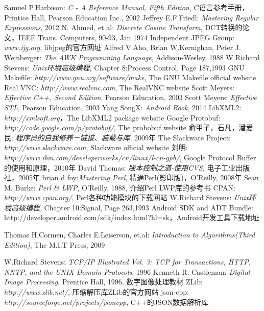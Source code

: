 \documentclass[a4paper]{book}
\begin{document}
\begin{thebibliography}{99}
 Samuel P.Harbison: {\em C - A Reference Manual, Fifth Edition}, C语言参考手册，Printice Hall, Pearson Education Inc., 2002
 Jeffrey E.F.Friedl: {\em Mastering Regular Expressions}, 2012
N. Ahmed, et al: {\em Discrete Cosine Transform}, DCT转换的论文，IEEE Trans. Computers, 90-93, Jan 1974
Independent JPEG Group: {\em www.ijg.org}, libjpeg的官方网址
 Alfred V.Aho, Brian W.Kernighan, Peter J. Weinberger: {\em The AWK Programming Language}, Addison-Wesley, 1988
 W.Richard Stevens: {\em Unix环境高级编程}, Chapter 8:Process Control, Page 187,1993
 GNU Makefile: {\em http://www.gnu.org/software/make}, The GNU Makefile official website
 Real VNC: {\em http://www.realvnc.com}, The RealVNC website
 Scott Meyers: {\em Effective C++, Second Edition}, Pearson Education, 2003
 Scott Meyers: {\em Effective STL}, Pearson Education, 2003
 Yang SongX: {\em Android Book}, 2014
 LibXML2: {\em http://xmlsoft.org}，The LibXML2 package website
 Google Protobuf: {\em http://code.google.com/p/protobuf/}, The probobuf website
 俞甲子，石凡，潘爱民: {\em 程序员的自我修养－链接、装载与库}, 2009年
 The Slackware Project: {\em http://www.slackware.com}, Slackware official website
 刘明: {\em http://www.ibm.com/developerworks/cn/linux/l-cn-gpb/}, Google Protocol Buffer 的使用和原理，2010年
 David Thomas: {\em 版本控制之道-使用CVS}, 电子工业出版社，2005年
 brian d foy:{\em Mastering Perl}, 精通Perl(影印版)，O'Reilly, 2008年
 Sean M. Burke: {\em Perl \& LWP}, O'Reilly, 1988, 介绍Perl LWP库的参考书
 CPAN: {\em http://www.cpan.org/}, Perl各种功能模块的下载网站
 W.Richard Stevens: {\em Unix环境高级编程}, Chapter 10:Signal, Page 263,1993
 Android SDK and ADT Bundle: http://developer.android.com/sdk/index.html?hl=sk，Android开发工具下载地址

Thomas H.Cormen, Charles E.Leiserson, et.al: {\em Introduction to Algorithms(Third Edition)}, The M.I.T Press, 2009

W.Richard Stevens: {\em TCP/IP Illustrated Vol. 3: TCP for Transactions, HTTP, NNTP, and the UNIX Domain Protocols}, 1996
 Kenneth R. Castleman: {\em Digital Image Processing}, Prentice Hall, 1996, 数字图像处理教材
 ZLib: {\em http://www.zlib.net/}, 压缩解压库ZLib的官方网站
 json-cpp: {\em http://sourceforge.net/projects/jsoncpp}, C++的JSON数据解析库


\end{thebibliography}
\end{document}
